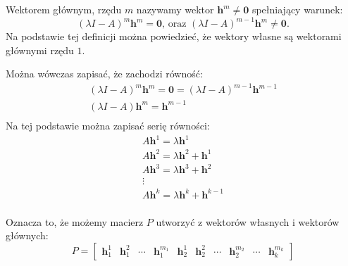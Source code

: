 \documentclass{article}
\begin{document}
Wektorem głównym, rzędu $m$ nazywamy wektor $\mathbf{h}^{m} \neq \mathbf{0}$ spełniający warunek:
$$
    (\lambda I - A)^{m}\mathbf{h}^{m} = \mathbf{0}, \, \text{oraz } (\lambda I - A)^{m-1}\mathbf{h}^{m} \neq \mathbf{0}.
$$
Na podstawie tej definicji można powiedzieć, że wektory własne są wektorami głównymi rzędu $1$.

Można wówczas zapisać, że zachodzi równość:
$$
    \begin{array}{c}
        (\lambda I - A)^{m} \mathbf{h}^{m} = \mathbf{0} = (\lambda I - A)^{m-1} \mathbf{h}^{m-1}\\
        (\lambda I - A) \mathbf{h}^{m} = \mathbf{h}^{m-1}\\
    \end{array}
$$
Na tej podstawie można  zapisać serię równości:
$$
    \begin{array}{l}
         A\mathbf{h}^{1} = \lambda\mathbf{h}^{1}\\
         A\mathbf{h}^{2} = \lambda\mathbf{h}^{2} + \mathbf{h}^{1}\\
         A\mathbf{h}^{3} = \lambda\mathbf{h}^{3} + \mathbf{h}^{2}\\
         \vdots \\
         A\mathbf{h}^{k} = \lambda\mathbf{h}^{k} + \mathbf{h}^{k-1}\\
    \end{array}
$$

Oznacza to, że możemy macierz $P$ utworzyć z wektorów własnych i wektorów głównych:
$$
    P
    =
    \begin{bmatrix}
        \mathbf{h}_{1}^{1} & \mathbf{h}_{1}^{2} & \cdots & \mathbf{h}_{1}^{m_{1}} &
        \mathbf{h}_{2}^{1} & \mathbf{h}_{2}^{2} & \cdots & \mathbf{h}_{2}^{m_{2}} &
        \cdots &
        \mathbf{h}_{k}^{m_{k}}
    \end{bmatrix}
$$
\end{document}
